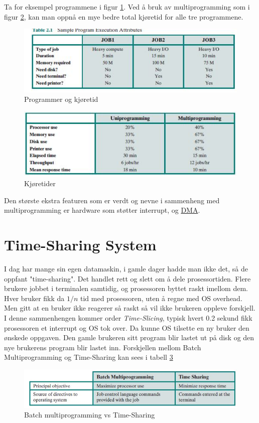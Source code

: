 Ta for eksempel programmene i figur \ref{fig:utilization}. Ved å bruk av multiprogramming som i figur \ref{fig:multiprog}, kan man oppnå en mye bedre total kjøretid for alle tre programmene. 
\begin{figure}
\centering
\includegraphics{img/utilization.JPG}
\caption{Programmer og kjøretid}
\label{fig:utilization}
\end{figure}
\begin{figure}
\centering
\includegraphics{img/multiprogramming.JPG}
\caption{Kjøretider}
\label{fig:multiprog}
\end{figure}

Den største ekstra featuren som er verdt og nevne i sammenheng med multiprogramming er hardware som støtter interrupt, og \href{https://en.wikipedia.org/wiki/Direct_memory_access}{DMA}. 
\section{Time-Sharing System}
I dag har mange sin egen datamaskin, i gamle dager hadde man ikke det, så de oppfant "time-sharing". Det handlet rett og slett om å dele prosessortiden. Flere brukere jobbet i terminalen samtidig, og prosessoren byttet raskt imellom dem. Hver bruker fikk da $1/n$ tid med prosessoren, uten å regne med OS overhead. Men gitt at en bruker ikke reagerer så raskt så vil ikke brukeren oppleve forskjell. I denne sammenhengen kommer order \emph{Time-Slicing}, typisk hvert 0.2 sekund fikk prosessoren et interrupt og OS tok over. Da kunne OS tilsette en ny bruker den ønskede oppgaven. Den gamle brukeren sitt program blir lastet ut på disk og den nye brukerens program blir lastet inn. Forskjellen mellom Batch Multiprogramming og Time-Sharing kan sees i tabell \ref{fig:batchvstime}
\begin{figure}
\centering
\includegraphics{img/batchvstime.jpg}
\caption{Batch multiprogramming vs Time-Sharing}
\label{fig:batchvstime}
\end{figure}

